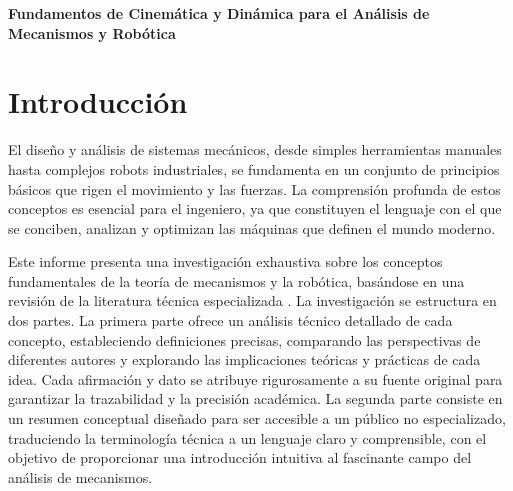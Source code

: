 \documentclass[12pt,a4paper]{article}
\begin{document}
\begin{center}
    {\Large \textbf{Fundamentos de Cinemática y Dinámica para el Análisis de Mecanismos y Robótica}} \\[0.3cm]
\end{center}

\vspace{0.5cm}

\section*{Introducción}

El diseño y análisis de sistemas mecánicos, desde simples herramientas manuales hasta complejos robots industriales, se fundamenta en un conjunto de principios básicos que rigen el movimiento y las fuerzas. La comprensión profunda de estos conceptos es esencial para el ingeniero, ya que constituyen el lenguaje con el que se conciben, analizan y optimizan las máquinas que definen el mundo moderno.

Este informe presenta una investigación exhaustiva sobre los conceptos fundamentales de la teoría de mecanismos y la robótica, basándose en una revisión de la literatura técnica especializada \cite{lopez-cajun-2008}. La investigación se estructura en dos partes. La primera parte ofrece un análisis técnico detallado de cada concepto, estableciendo definiciones precisas, comparando las perspectivas de diferentes autores y explorando las implicaciones teóricas y prácticas de cada idea. Cada afirmación y dato se atribuye rigurosamente a su fuente original para garantizar la trazabilidad y la precisión académica. La segunda parte consiste en un resumen conceptual diseñado para ser accesible a un público no especializado, traduciendo la terminología técnica a un lenguaje claro y comprensible, con el objetivo de proporcionar una introducción intuitiva al fascinante campo del análisis de mecanismos.
\end{document}
